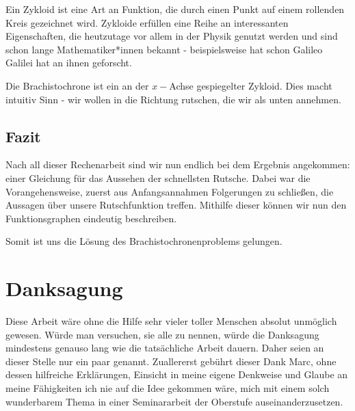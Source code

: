 Ein Zykloid ist eine Art an Funktion, die durch einen Punkt auf einem rollenden Kreis gezeichnet wird. 
Zykloide erfüllen eine Reihe an interessanten Eigenschaften, die heutzutage vor allem in der Physik genutzt werden und sind schon lange Mathematiker*innen bekannt - beispielsweise hat schon Galileo Galilei hat an ihnen geforscht. 

Die Brachistochrone ist ein an der $x-$Achse gespiegelter Zykloid. 
Dies macht intuitiv Sinn - wir wollen in die Richtung rutschen, die wir als unten annehmen. 




\section{Fazit}
Nach all dieser Rechenarbeit sind wir nun endlich bei dem Ergebnis angekommen: einer Gleichung für das Aussehen der schnellsten Rutsche. Dabei war die Vorangehensweise, zuerst aus Anfangsannahmen Folgerungen zu schließen, die Aussagen über unsere Rutschfunktion treffen. Mithilfe dieser können wir nun den Funktionsgraphen eindeutig beschreiben.

Somit ist uns die Lösung des Brachistochronenproblems gelungen.


\nocite{*}

\chapter*{Danksagung}
Diese Arbeit wäre ohne die Hilfe sehr vieler toller Menschen absolut unmöglich gewesen.
Würde man versuchen, sie alle zu nennen, würde die Danksagung mindestens genauso lang wie die tatsächliche Arbeit dauern. 
Daher seien an dieser Stelle nur ein paar genannt.
Zuallererst gebührt dieser Dank Marc, 
ohne dessen hilfreiche Erklärungen, 
Einsicht in meine eigene Denkweise und 
Glaube an meine Fähigkeiten ich nie auf die Idee gekommen wäre, 
mich mit einem solch wunderbarem Thema in einer Seminararbeit der Oberstufe auseinanderzusetzen. 

